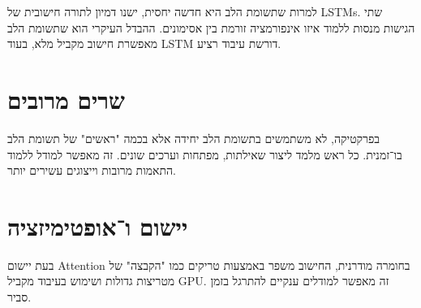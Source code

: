 למרות שתשומת הלב היא חדשה יחסית, ישנו דמיון לתורה חישובית של \textenglish{LSTMs}.
שתי הגישות מנסות ללמוד איזו אינפורמציה זורמת בין אסימונים.
ההבדל העיקרי הוא שתשומת הלב מאפשרת חישוב מקביל מלא, בעוד \textenglish{LSTM} דורשת עיבוד רציע.

\section{שרים מרובים}

בפרקטיקה, לא משתמשים בתשומת הלב יחידה אלא בכמה "ראשים" של תשומת הלב בו־זמנית.
כל ראש מלמד ליצור שאילתות, מפתחות וערכים שונים.
זה מאפשר למודל ללמוד התאמות מרובות וייצוגים עשירים יותר.

\section{יישום ו־אופטימיזציה}

בעת יישום \textenglish{Attention} בחומרה מודרנית,
החישוב משפר באמצעות טריקים כמו "הקבצה" של מטריצות גדולות
ושימוש בעיבוד מקביל \textenglish{GPU}.
זה מאפשר למודלים ענקיים להתרגל בזמן סביר.
